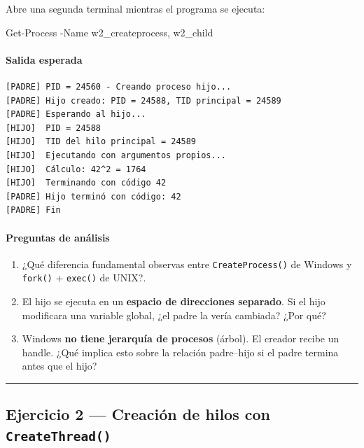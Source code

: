 \documentclass[
  spanish,
]{article}
\newenvironment{Shaded}{}{}
\newcommand{\FunctionTok}[1]{\textcolor[rgb]{0.02,0.16,0.49}{#1}}
\newcommand{\NormalTok}[1]{#1}
\newcommand{\OperatorTok}[1]{\textcolor[rgb]{0.40,0.40,0.40}{#1}}
\providecommand{\tightlist}{%
  \setlength{\itemsep}{0pt}\setlength{\parskip}{0pt}}
\begin{document}
Abre una segunda terminal mientras el programa se ejecuta:

\begin{Shaded}
\begin{Highlighting}[]
\FunctionTok{Get{-}Process} \OperatorTok{{-}}\NormalTok{Name w2\_createprocess}\OperatorTok{,}\NormalTok{ w2\_child}
\end{Highlighting}
\end{Shaded}

\paragraph{Salida esperada}\label{salida-esperada-1}

\begin{verbatim}
[PADRE] PID = 24560 - Creando proceso hijo...
[PADRE] Hijo creado: PID = 24588, TID principal = 24589
[PADRE] Esperando al hijo...
[HIJO]  PID = 24588
[HIJO]  TID del hilo principal = 24589
[HIJO]  Ejecutando con argumentos propios...
[HIJO]  Cálculo: 42^2 = 1764
[HIJO]  Terminando con código 42
[PADRE] Hijo terminó con código: 42
[PADRE] Fin
\end{verbatim}

\paragraph{Preguntas de análisis}\label{preguntas-de-anuxe1lisis-1}

\begin{enumerate}
\def\labelenumi{\arabic{enumi}.}
\tightlist
\item
  ¿Qué diferencia fundamental observas entre \texttt{CreateProcess()} de
  Windows y \texttt{fork()} + \texttt{exec()} de UNIX?.
\item
  El hijo se ejecuta en un \textbf{espacio de direcciones separado}. Si
  el hijo modificara una variable global, ¿el padre la vería cambiada?
  ¿Por qué?
\item
  Windows \textbf{no tiene jerarquía de procesos} (árbol). El creador
  recibe un handle. ¿Qué implica esto sobre la relación padre--hijo si
  el padre termina antes que el hijo?
\end{enumerate}

\begin{center}\rule{0.5\linewidth}{0.5pt}\end{center}

\subsection{\texorpdfstring{Ejercicio 2 --- Creación de hilos con
\texttt{CreateThread()}}{Ejercicio 2 --- Creación de hilos con CreateThread()}}\label{ejercicio-2-creaciuxf3n-de-hilos-con-createthread}
\end{document}
